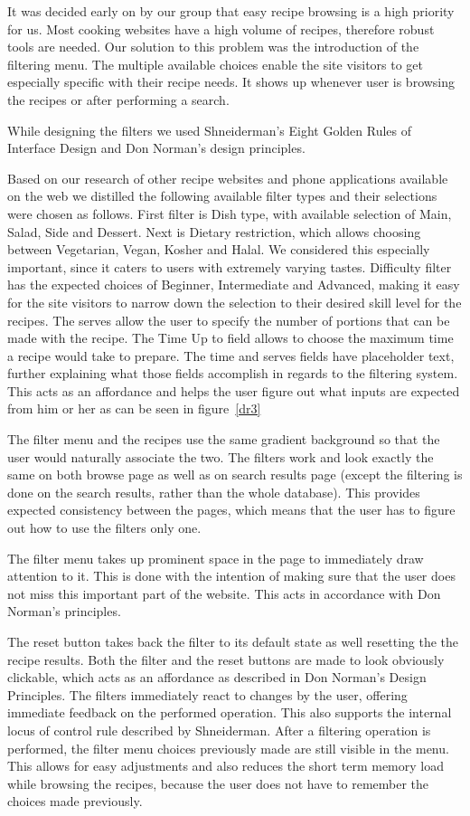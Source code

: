It was decided early on by our group that easy recipe browsing is a high priority for us. Most cooking websites have a high volume of recipes, therefore robust tools are needed. Our solution to this problem was the introduction of the filtering menu. The multiple available choices enable the site visitors to get especially specific with their recipe needs. It shows up whenever user is browsing the recipes or after performing a search.

While designing the filters we used Shneiderman’s Eight Golden Rules of Interface Design and Don Norman’s design principles.

Based on our research of other recipe websites and phone applications available on the web  we distilled the following available filter types and their selections were chosen as follows. First filter is Dish type, with available selection of Main, Salad, Side and Dessert. Next is Dietary restriction, which allows choosing between Vegetarian, Vegan, Kosher and Halal. We considered this especially important, since it caters to users with extremely varying tastes. Difficulty filter has the expected choices of Beginner, Intermediate and Advanced, making it easy for the site visitors to narrow down the selection to their desired skill level for the recipes. The serves allow the user to specify the number of portions that can be made with the recipe. The Time Up to field allows to choose the maximum time a recipe would take to prepare. The time and serves fields have placeholder text, further explaining what those fields accomplish in regards to the filtering system. This acts as an affordance and helps the user figure out what inputs are expected from him or her as can be seen in figure~\ref{dr3}

The filter menu and the recipes use the same gradient background so that the user would naturally associate the two. The filters work and look exactly the same on both browse page as well as on search results page (except the filtering is done on the search results, rather than the whole database). This provides expected consistency between the pages, which means that the user has to figure out how to use the filters only one.

The filter menu takes up prominent space in the page to immediately draw attention to it. This is done with the intention of making sure that the user does not miss this important part of the website. This acts in accordance with Don Norman’s principles.

The reset button takes back the filter to its default state as well resetting the the recipe results. Both the filter and the reset buttons are made to look obviously clickable, which acts as an affordance as described in Don Norman’s Design Principles. The filters immediately react to changes by the user, offering immediate feedback on the performed operation. This also supports the internal locus of control rule described by Shneiderman. After a filtering operation is performed, the filter menu choices previously made are still visible in the menu. This allows for easy adjustments and also reduces the short term memory load while browsing the recipes, because the user does not have to remember the choices made previously.


